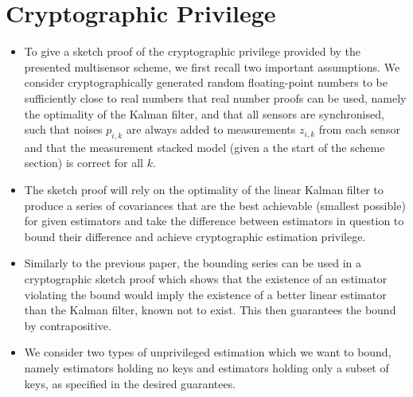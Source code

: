 \documentclass[conference]{IEEEtran}
\begin{document}
\section{Cryptographic Privilege}\label{sec:crypto}
\begin{itemize}
  \item To give a sketch proof of the cryptographic privilege provided by the presented multisensor scheme, we first recall two important assumptions. We consider cryptographically generated random floating-point numbers to be sufficiently close to real numbers that real number proofs can be used, namely the optimality of the Kalman filter, and that all sensors are synchronised, such that noises $p_{i,k}$ are always added to measurements $z_{i,k}$ from each sensor and that the measurement stacked model (given a the start of the scheme section) is correct for all $k$.
  \item The sketch proof will rely on the optimality of the linear Kalman filter to produce a series of covariances that are the best achievable (smallest possible) for given estimators and take the difference between estimators in question to bound their difference and achieve cryptographic estimation privilege.
  \item Similarly to the previous paper, the bounding series can be used in a cryptographic sketch proof which shows that the existence of an estimator violating the bound would imply the existence of a better linear estimator than the Kalman filter, known not to exist. This then guarantees the bound by contrapositive.
  \item We consider two types of unprivileged estimation which we want to bound, namely estimators holding no keys and estimators holding only a subset of keys, as specified in the desired guarantees.
\end{itemize}
\end{document}
